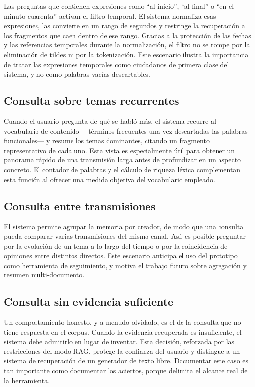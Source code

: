 \documentclass[12pt,a4paper]{article}
\begin{document}
Las preguntas que contienen expresiones como ``al inicio'', ``al final'' o ``en el minuto cuarenta'' activan el filtro temporal. El sistema normaliza esas expresiones, las convierte en un rango de segundos y restringe la recuperación a los fragmentos que caen dentro de ese rango. Gracias a la protección de las fechas y las referencias temporales durante la normalización, el filtro no se rompe por la eliminación de tildes ni por la tokenización. Este escenario ilustra la importancia de tratar las expresiones temporales como ciudadanos de primera clase del sistema, y no como palabras vacías descartables.

\subsection{Consulta sobre temas recurrentes}

Cuando el usuario pregunta de qué se habló más, el sistema recurre al vocabulario de contenido —términos frecuentes una vez descartadas las palabras funcionales— y resume los temas dominantes, citando un fragmento representativo de cada uno. Esta vista es especialmente útil para obtener un panorama rápido de una transmisión larga antes de profundizar en un aspecto concreto. El contador de palabras y el cálculo de riqueza léxica complementan esta función al ofrecer una medida objetiva del vocabulario empleado.

\subsection{Consulta entre transmisiones}

El sistema permite agrupar la memoria por creador, de modo que una consulta pueda comparar varias transmisiones del mismo canal. Así, es posible preguntar por la evolución de un tema a lo largo del tiempo o por la coincidencia de opiniones entre distintos directos. Este escenario anticipa el uso del prototipo como herramienta de seguimiento, y motiva el trabajo futuro sobre agregación y resumen multi-documento.

\subsection{Consulta sin evidencia suficiente}

Un comportamiento honesto, y a menudo olvidado, es el de la consulta que no tiene respuesta en el corpus. Cuando la evidencia recuperada es insuficiente, el sistema debe admitirlo en lugar de inventar. Esta decisión, reforzada por las restricciones del modo RAG, protege la confianza del usuario y distingue a un sistema de recuperación de un generador de texto libre. Documentar este caso es tan importante como documentar los aciertos, porque delimita el alcance real de la herramienta.
\end{document}
